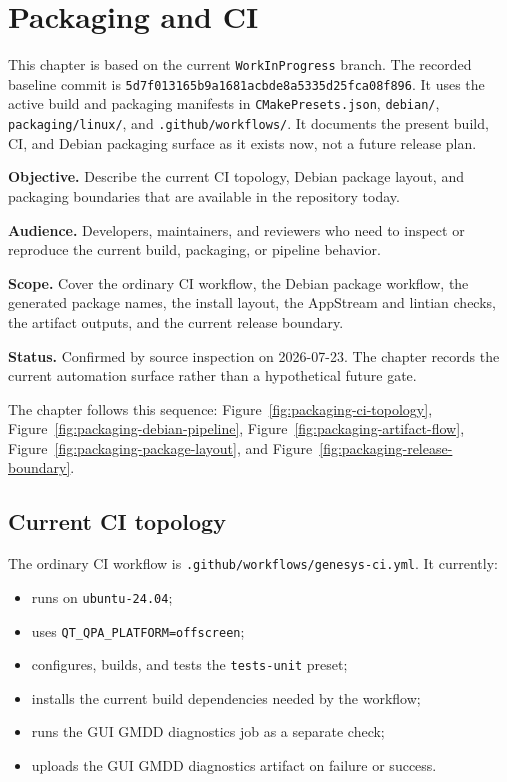\chapter{Packaging and CI}
\label{chap:packaging-and-ci}

This chapter is based on the current \texttt{WorkInProgress} branch.
The recorded baseline commit is \texttt{5d7f013165b9a1681acbde8a5335d25fca08f896}.
It uses the active build and packaging manifests in
\texttt{CMakePresets.json}, \texttt{debian/}, \texttt{packaging/linux/}, and
\texttt{.github/workflows/}. It documents the present build, CI, and Debian
packaging surface as it exists now, not a future release plan.

\noindent\textbf{Objective.} Describe the current CI topology, Debian package
layout, and packaging boundaries that are available in the repository today.

\noindent\textbf{Audience.} Developers, maintainers, and reviewers who need to
inspect or reproduce the current build, packaging, or pipeline behavior.

\noindent\textbf{Scope.} Cover the ordinary CI workflow, the Debian package
workflow, the generated package names, the install layout, the AppStream and
lintian checks, the artifact outputs, and the current release boundary.

\noindent\textbf{Status.} Confirmed by source inspection on 2026-07-23. The
chapter records the current automation surface rather than a hypothetical future
gate.

The chapter follows this sequence:
Figure~\ref{fig:packaging-ci-topology},
Figure~\ref{fig:packaging-debian-pipeline},
Figure~\ref{fig:packaging-artifact-flow},
Figure~\ref{fig:packaging-package-layout}, and
Figure~\ref{fig:packaging-release-boundary}.

\section{Current CI topology}
\label{sec:packaging-current-ci-topology}

The ordinary CI workflow is \texttt{.github/workflows/genesys-ci.yml}. It
currently:
\begin{itemize}
\item runs on \texttt{ubuntu-24.04};
\item uses \texttt{QT\_QPA\_PLATFORM=offscreen};
\item configures, builds, and tests the \texttt{tests-unit} preset;
\item installs the current build dependencies needed by the workflow;
\item runs the GUI GMDD diagnostics job as a separate check;
\item uploads the GUI GMDD diagnostics artifact on failure or success.
\end{itemize}


